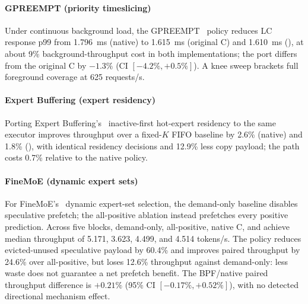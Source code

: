 \paragraph{GPREEMPT (priority timeslicing)}
Under continuous background load, the GPREEMPT~\cite{fan2025gpreempt} policy reduces LC response p99 from 1.796~ms (native) to 1.615~ms (original C) and 1.610~ms (\sys{}), at about 9\% background-throughput cost in both implementations; the \sys{} port differs from the original C by $-1.3\%$ (CI $[-4.2\%,+0.5\%]$).
A knee sweep brackets full foreground coverage at 625 requests/s.

\paragraph{Expert Buffering (expert residency)}
Porting Expert Buffering's~\cite{huang2023towards} inactive-first hot-expert residency to the same executor improves throughput over a fixed-$K$ FIFO baseline by 2.6\% (native) and 1.8\% (\sys{}), with identical residency decisions and 12.9\% less copy payload; the \sys{} path costs 0.7\% relative to the native policy.

\paragraph{FineMoE (dynamic expert sets)}
For FineMoE's~\cite{yu2026finemoe} dynamic expert-set selection, the demand-only baseline disables speculative prefetch; the all-positive ablation instead prefetches every positive prediction.
Across five blocks, demand-only, all-positive, native C, and \sys{} achieve median throughput of 5.171, 3.623, 4.499, and 4.514 tokens/s.
The \sys{} policy reduces evicted-unused speculative payload by 60.4\% and improves paired throughput by 24.6\% over all-positive, but loses 12.6\% throughput against demand-only: less waste does not guarantee a net prefetch benefit.
The BPF/native paired throughput difference is $+0.21\%$ (95\% CI $[-0.17\%,+0.52\%]$), with no detected directional mechanism effect.

